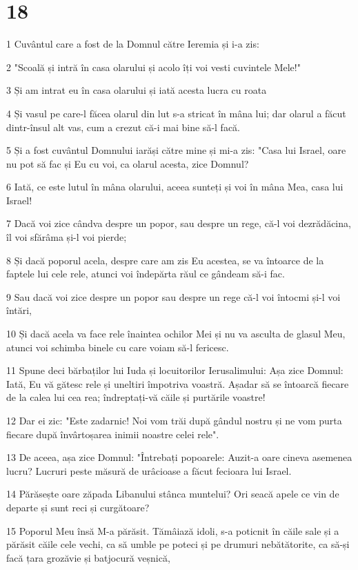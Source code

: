 \chapter{18}

\par 1 Cuvântul care a fost de la Domnul către Ieremia și i-a zis:
\par 2 "Scoală și intră în casa olarului și acolo îți voi vesti cuvintele Mele!"
\par 3 Și am intrat eu în casa olarului și iată acesta lucra cu roata
\par 4 Și vasul pe care-l făcea olarul din lut s-a stricat în mâna lui; dar olarul a făcut dintr-însul alt vas, cum a crezut că-i mai bine să-l facă.
\par 5 Și a fost cuvântul Domnului iarăși către mine și mi-a zis: "Casa lui Israel, oare nu pot să fac și Eu cu voi, ca olarul acesta, zice Domnul?
\par 6 Iată, ce este lutul în mâna olarului, aceea sunteți și voi în mâna Mea, casa lui Israel!
\par 7 Dacă voi zice cândva despre un popor, sau despre un rege, că-l voi dezrădăcina, îl voi sfărâma și-l voi pierde;
\par 8 Și dacă poporul acela, despre care am zis Eu acestea, se va întoarce de la faptele lui cele rele, atunci voi îndepărta răul ce gândeam să-i fac.
\par 9 Sau dacă voi zice despre un popor sau despre un rege că-l voi întocmi și-l voi întări,
\par 10 Și dacă acela va face rele înaintea ochilor Mei și nu va asculta de glasul Meu, atunci voi schimba binele cu care voiam să-l fericesc.
\par 11 Spune deci bărbaților lui Iuda și locuitorilor Ierusalimului: Așa zice Domnul: Iată, Eu vă gătesc rele și uneltiri împotriva voastră. Așadar să se întoarcă fiecare de la calea lui cea rea; îndreptați-vă căile și purtările voastre!
\par 12 Dar ei zic: "Este zadarnic! Noi vom trăi după gândul nostru și ne vom purta fiecare după învârtoșarea inimii noastre celei rele".
\par 13 De aceea, așa zice Domnul: "Întrebați popoarele: Auzit-a oare cineva asemenea lucru? Lucruri peste măsură de urâcioase a făcut fecioara lui Israel.
\par 14 Părăsește oare zăpada Libanului stânca muntelui? Ori seacă apele ce vin de departe și sunt reci și curgătoare?
\par 15 Poporul Meu însă M-a părăsit. Tămâiază idoli, s-a poticnit în căile sale și a părăsit căile cele vechi, ca să umble pe poteci și pe drumuri nebătătorite, ca să-și facă țara grozăvie și batjocură veșnică,
